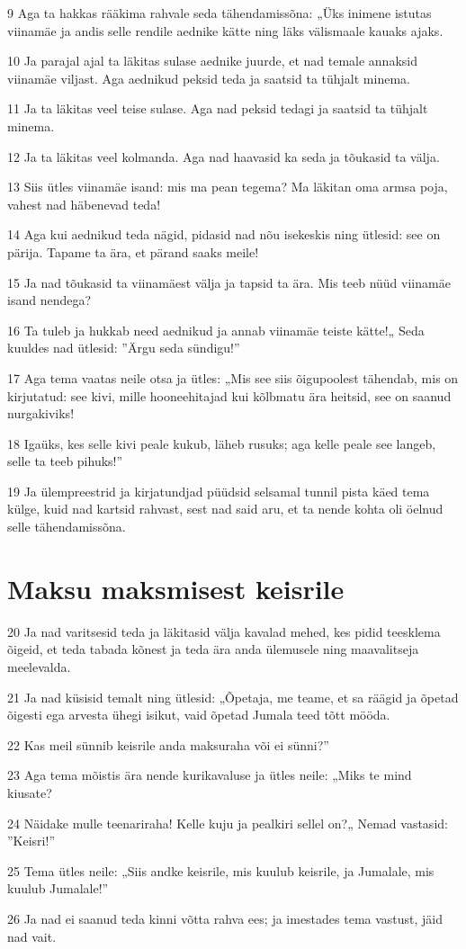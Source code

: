 \par 9 Aga ta hakkas rääkima rahvale seda tähendamissõna: „Üks inimene istutas viinamäe ja andis selle rendile aednike kätte ning läks välismaale kauaks ajaks.
\par 10 Ja parajal ajal ta läkitas sulase aednike juurde, et nad temale annaksid viinamäe viljast. Aga aednikud peksid teda ja saatsid ta tühjalt minema.
\par 11 Ja ta läkitas veel teise sulase. Aga nad peksid tedagi ja saatsid ta tühjalt minema.
\par 12 Ja ta läkitas veel kolmanda. Aga nad haavasid ka seda ja tõukasid ta välja.
\par 13 Siis ütles viinamäe isand: mis ma pean tegema? Ma läkitan oma armsa poja, vahest nad häbenevad teda!
\par 14 Aga kui aednikud teda nägid, pidasid nad nõu isekeskis ning ütlesid: see on pärija. Tapame ta ära, et pärand saaks meile!
\par 15 Ja nad tõukasid ta viinamäest välja ja tapsid ta ära. Mis teeb nüüd viinamäe isand nendega?
\par 16 Ta tuleb ja hukkab need aednikud ja annab viinamäe teiste kätte!„ Seda kuuldes nad ütlesid: ”Ärgu seda sündigu!”
\par 17 Aga tema vaatas neile otsa ja ütles: „Mis see siis õigupoolest tähendab, mis on kirjutatud: see kivi, mille hooneehitajad kui kõlbmatu ära heitsid, see on saanud nurgakiviks!
\par 18 Igaüks, kes selle kivi peale kukub, läheb rusuks; aga kelle peale see langeb, selle ta teeb pihuks!”
\par 19 Ja ülempreestrid ja kirjatundjad püüdsid selsamal tunnil pista käed tema külge, kuid nad kartsid rahvast, sest nad said aru, et ta nende kohta oli öelnud selle tähendamissõna.

\section*{Maksu maksmisest keisrile}

\par 20 Ja nad varitsesid teda ja läkitasid välja kavalad mehed, kes pidid teesklema õigeid, et teda tabada kõnest ja teda ära anda ülemusele ning maavalitseja meelevalda.
\par 21 Ja nad küsisid temalt ning ütlesid: „Õpetaja, me teame, et sa räägid ja õpetad õigesti ega arvesta ühegi isikut, vaid õpetad Jumala teed tõtt mööda.
\par 22 Kas meil sünnib keisrile anda maksuraha või ei sünni?”
\par 23 Aga tema mõistis ära nende kurikavaluse ja ütles neile: „Miks te mind kiusate?
\par 24 Näidake mulle teenariraha! Kelle kuju ja pealkiri sellel on?„ Nemad vastasid: ”Keisri!”
\par 25 Tema ütles neile: „Siis andke keisrile, mis kuulub keisrile, ja Jumalale, mis kuulub Jumalale!”
\par 26 Ja nad ei saanud teda kinni võtta rahva ees; ja imestades tema vastust, jäid nad vait.

